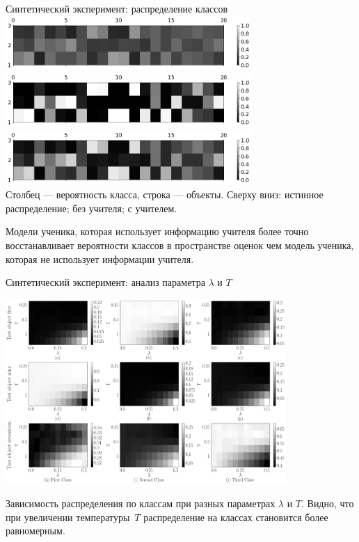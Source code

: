 \documentclass[10pt,pdf,hyperref={unicode}]{beamer}
\begin{document}
\begin{frame}{Синтетический эксперимент: распределение классов}
\justifying
{\center
\includegraphics[width=0.7\textwidth]{figures/syn_real_distr}\\
\includegraphics[width=0.7\textwidth]{figures/syn_without_teacher_distr}\\
\includegraphics[width=0.7\textwidth]{figures/syn_with_teacher_distr}\\
}
Столбец --- вероятность класса, строка --- объекты.
Сверху вниз: истинное распределение; без учителя; с учителем.

Модели ученика, которая использует информацию учителя более точно восстанавливает вероятности классов в пространстве оценок чем модель ученика, которая не использует информации учителя.
\end{frame}

\begin{frame}{Синтетический эксперимент: анализ параметра $\lambda$ и $T$}
\justifying
\begin{center}
{\center
\includegraphics[width=0.8\textwidth]{figures/syn_T_lambda}
}
\end{center}

Зависимость распределения по классам при разных параметрах $\lambda$ и $T$.  Видно, что при увеличении температуры~$T$ распределение на классах становится более равномерным.

\end{frame}
\end{document}
